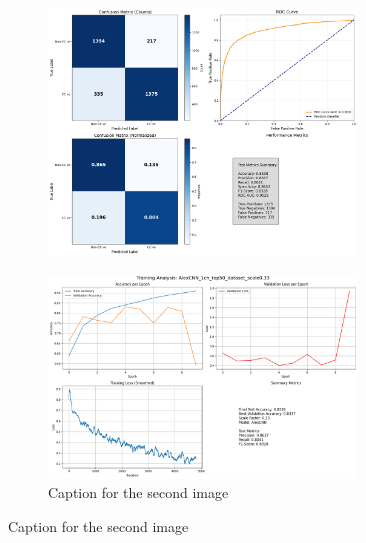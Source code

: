 \documentclass{pracalicmgr}
\begin{document}
\newpage

\begin{figure}[H]
    \centering
    \begin{subfigure}{\textwidth}
        \centering
        \includegraphics[width=0.9\textwidth]{src/AlexCNN_1ch_top50_dataset_scale033.png}
        \label{fig:top5033sub1}
    \end{subfigure}
    
    \vspace{1cm}
    
    \begin{subfigure}{\textwidth}
        \centering
        \includegraphics[width=0.9\textwidth]{src/AlexCNN_1ch_top50_dataset_scale033loss.png}
        \caption{Caption for the second image}
        \label{fig:top5033sub2}
    \end{subfigure}
    \label{fig:top5033stacked}
\end{figure}
\end{document}
